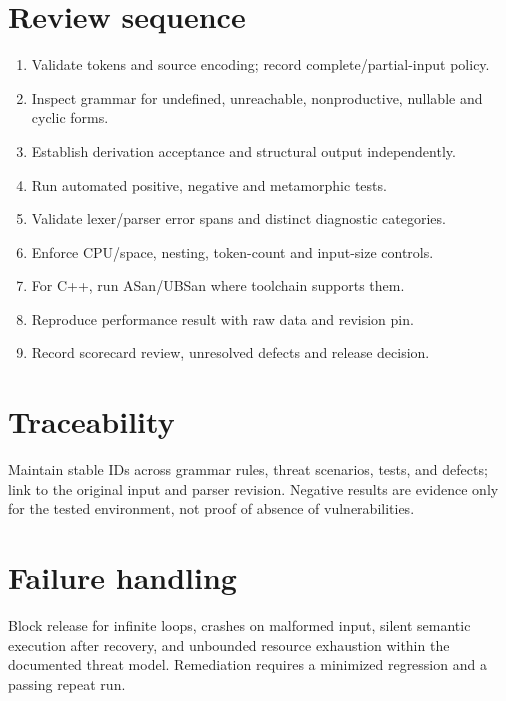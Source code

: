 \documentclass[11pt,letterpaper]{article}
\begin{document}
\makedoctitle\makedocsummary
\tableofcontents\clearpage
\section{Review sequence}
\begin{enumerate}\item Validate tokens and source encoding; record complete/partial-input policy.\item Inspect grammar for undefined, unreachable, nonproductive, nullable and cyclic forms.\item Establish derivation acceptance and structural output independently.\item Run automated positive, negative and metamorphic tests.\item Validate lexer/parser error spans and distinct diagnostic categories.\item Enforce CPU/space, nesting, token-count and input-size controls.\item For C++, run ASan/UBSan where toolchain supports them.\item Reproduce performance result with raw data and revision pin.\item Record scorecard review, unresolved defects and release decision.\end{enumerate}
\section{Traceability}
Maintain stable IDs across grammar rules, threat scenarios, tests, and defects; link to the original input and parser revision. Negative results are evidence only for the tested environment, not proof of absence of vulnerabilities.
\section{Failure handling}
Block release for infinite loops, crashes on malformed input, silent semantic execution after recovery, and unbounded resource exhaustion within the documented threat model. Remediation requires a minimized regression and a passing repeat run.
\end{document}
